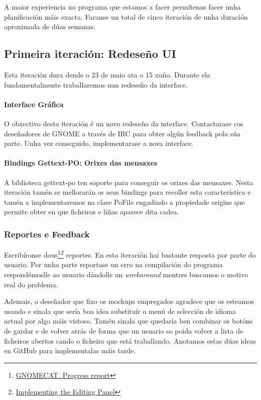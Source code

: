 A maior experiencia no programa que estamos a facer permítenos facer unha planificación máis exacta. Faranse un total de cinco iteración de unha duración aproximada de dúas semanas.

\subsection{Primeira iteración: Redeseño UI}

Esta iteración dura dende o 23 de maio ata o 15 xuño. Durante ela fundamentalmente traballaremos nun redeseño da interface.

\paragraph{Interface Gráfica} O obxectivo desta iteración é un novo redeseño da interface. Contactarase cos deseñadores de GNOME a través de IRC para obter algún feedback pola súa parte. Unha vez conseguido, implementarase a nova interface.

\paragraph{Bindings Gettext-PO: Orixes das mensaxes}
A biblioteca gettext-po ten soporte para conseguir os orixes das mensaxes. Nesta iteración tamén se mellorarán os seus bindings para recoller esta característica e tamén a implementaremos na clase PoFile engadindo a propiedade origins que permite obter en que ficheiros e liñas aparece dita cadea.

\subsubsection{Reportes e Feedback}
Escribíronse dous\footnote{\href{http://aquelando.info/gnomecat-progress-report/}{GNOMECAT. Progress report}}\footnote{\href{http://aquelando.info/implementing-the-editing-panel/}{Implementing the Editing Panel}} reportes. En esta iteración hai bastante resposta por parte do usuario. Por unha parte reportase un erro na compilación do programa respondémoslle ao usuario dándolle un \emph{workaround} mentres buscamos o motivo real do problema.

Ademais, o deseñador que fixo os mockups empregados agradece que os esteamos usando e sinala que sería boa idea substituír o menú de selección de idioma actual por algo máis vistoso. Tamén sinala que quedaría ben combinar os botóns de gardar e de volver atrás de forma que un usuario so poida volver a lista de ficheiros abertos cando o ficheiro que está traballando. Anotamos estas dúas ideas en GitHub para implementalas máis tarde.

